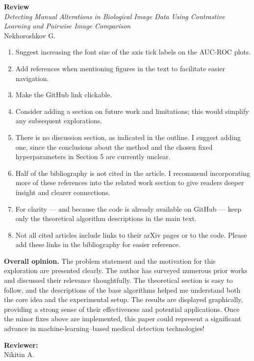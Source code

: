 \documentclass[a4paper,12pt]{article}
\begin{document}
\pagestyle{empty}

\begin{center}
  {\Large\textbf{Review}}\\[1em]
  {\large\textit{Detecting Manual Alterations in Biological Image Data Using Contrastive Learning and Pairwise Image Comparison}}\\[0.5em]
  {Nekhoroshkov G.}
\end{center}

\begin{enumerate}
  \item Suggest increasing the font size of the axis tick labels on the AUC-ROC plots.
  \item Add references when mentioning figures in the text to facilitate easier navigation.
  \item Make the GitHub link clickable.
  \item Consider adding a section on future work and limitations; this would simplify any subsequent explorations.
  \item There is no discussion section, as indicated in the outline. I suggest adding one, since the conclusions about the
        method and the chosen fixed hyperparameters in Section 5 are currently unclear.
  \item Half of the bibliography is not cited in the article. I recommend incorporating more of these references into the
        related work section to give readers deeper insight and clearer connections.
  \item For clarity --- and because the code is already available on GitHub --- keep only the theoretical algorithm descriptions
        in the main text.
  \item Not all cited articles include links to their arXiv pages or to the code. Please add these links in the bibliography
        for easier reference.
\end{enumerate}

\noindent\textbf{Overall opinion.} The problem statement and the motivation for this exploration are presented clearly.
The author has surveyed numerous prior works and discussed their relevance thoughtfully. The theoretical section is easy to
follow, and the descriptions of the base algorithms helped me understand both the core idea and the experimental setup.
The results are displayed graphically, providing a strong sense of their effectiveness and potential applications. Once the
minor fixes above are implemented, this paper could represent a significant advance in machine-learning–based medical
detection technologies!

\begin{flushright}
  \noindent\textbf{Reviewer:}\\
  Nikitin A.
\end{flushright}
\end{document}
